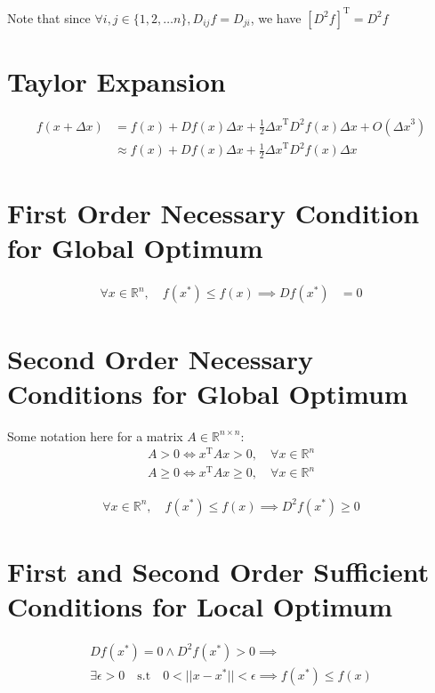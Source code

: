 \documentclass{article}
\begin{document}
Note that since $ \forall i, j \in \{1, 2, \ldots n \}, D_{ij} f = D_{ji}$, we have $\left[ D^2 f \right]^\mathrm{T} = D^2 f$

\section{Taylor Expansion}
\begin{align}
    f(x + \Delta x) &= f(x) + Df(x) \Delta x + \frac{1}{2} {\Delta x}^\mathrm{T} D^2 f(x) \Delta x + O \left( {\Delta x}^3 \right) \\
    &\approx f(x) + Df(x) \Delta x + \frac{1}{2} {\Delta x}^\mathrm{T} D^2 f(x) \Delta x
\end{align}

\section{First Order Necessary Condition for Global Optimum}

\begin{align}
    \forall x \in \mathbb{R}^n, \quad f(x^*) \leq f(x) \implies Df(x^*) &= 0
\end{align}

\section{Second Order Necessary Conditions for Global Optimum}

Some notation here for a matrix $A \in \mathbb{R}^{n \times n}$:
\begin{align}
    A > 0 \iff x^\mathrm{T} A x > 0, \quad \forall x \in \mathbb{R}^n \\
    A \geq 0 \iff x^\mathrm{T} A x \geq 0, \quad \forall x \in \mathbb{R}^n
\end{align}

\begin{align}
    \forall x \in \mathbb{R}^n, \quad f(x^*) \leq f(x) \implies D^2f(x^*) \geq 0
\end{align}

\section{First and Second Order Sufficient Conditions for Local Optimum}

\begin{align}
    Df(x^*) = 0 \land D^2f(x^*) > 0 \implies \\
    \exists \epsilon > 0 \quad \mathrm{s.t} \quad 0 < || x - x^* || < \epsilon \implies f(x^*) \leq f(x) 
\end{align}
\end{document}
